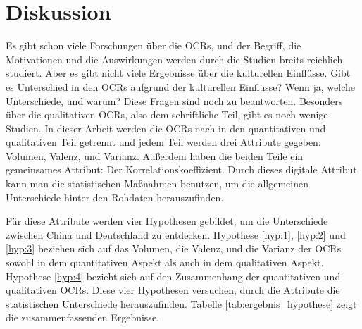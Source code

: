\chapter{Diskussion} \label{diskussion}
Es gibt schon viele Forschungen über die \acl{OCRs}, und der Begriff, die Motivationen und die Auswirkungen werden durch die Studien breits reichlich studiert. Aber es gibt nicht viele Ergebnisse über die kulturellen Einflüsse. Gibt es Unterschied in den \ac{OCRs} aufgrund der kulturellen Einflüsse? Wenn ja, welche Unterschiede, und warum? Diese Fragen sind noch zu beantworten. Besonders über die qualitativen \ac{OCRs}, also dem schriftliche Teil, gibt es noch wenige Studien. In dieser Arbeit werden die \ac{OCRs} nach \citet{Shrihari2012} in den quantitativen und qualitativen Teil getrennt und jedem Teil werden drei Attribute gegeben: Volumen, Valenz, und Varianz. Außerdem haben die beiden Teile ein gemeinsames Attribut: Der Korrelationskoeffizient. Durch dieses digitale Attribut kann man die statistischen Maßnahmen benutzen, um die allgemeinen Unterschiede hinter den Rohdaten herauszufinden.

Für diese Attribute werden vier Hypothesen gebildet, um die Unterschiede zwischen China und Deutschland zu entdecken. Hypothese \ref{hyp:1}, \ref{hyp:2} und \ref{hyp:3} beziehen sich auf das Volumen, die Valenz, und die Varianz der \ac{OCRs} sowohl in dem quantitativen Aspekt als auch in dem qualitativen Aspekt. Hypothese \ref{hyp:4} bezieht sich auf den Zusammenhang der quantitativen und qualitativen \ac{OCRs}. Diese vier Hypothesen versuchen, durch die Attribute die statistischen Unterschiede herauszufinden. Tabelle \ref{tab:ergebnis_hypothese} zeigt die zusammenfassenden Ergebnisse.

\begin{table}[h]
\centering
{}
\caption[Die zusammenfassenden Ergebnisse von Hypothesen]{Die zusammenfassenden Ergebnisse von Hypothesen (*: Ausnahme ist Puma) (Quelle: Eigene Darstellung)}
\label{tab:ergebnis_hypothese}
\end{table}


